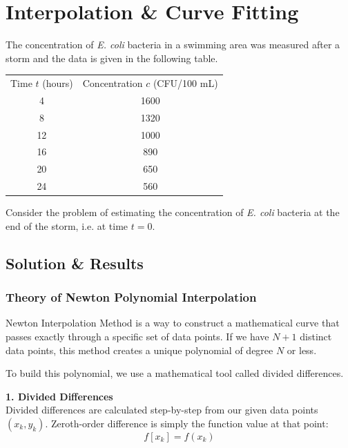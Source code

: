\newpage


\section{Interpolation \& Curve Fitting}

The concentration of \textit{E. coli} bacteria in a swimming area was measured after a storm and the data is given in the following table.

\begin{table}[h!]
    \centering
    \begin{tabular}{cc}
        Time $t$ (hours) & Concentration $c$ (CFU/100 mL) \\
        4  & 1600 \\
        8  & 1320 \\
        12 & 1000 \\
        16 & 890  \\
        20 & 650  \\
        24 & 560  \\
    \end{tabular}
\end{table}

Consider the problem of estimating the concentration of \textit{E. coli} bacteria at the end of the storm, i.e. at time $t = 0$.  

\subsection{Solution \& Results}

\subsubsection{Theory of Newton Polynomial Interpolation}

Newton Interpolation Method is a way to construct a mathematical curve that passes exactly through a specific set of data points. If we have $N + 1$ distinct data points, this method creates a unique polynomial of degree $N$ or less.

To build this polynomial, we use a mathematical tool called divided differences.

\vspace{5pt}
\noindent\textbf{1. Divided Differences} \cite[page 223]{MathewsFink2003} \\
Divided differences are calculated step-by-step from our given data points $(x_k, y_k)$.
Zeroth-order difference is simply the function value at that point:
\begin{equation*}
    f[x_k] = f(x_k)
\end{equation*}

